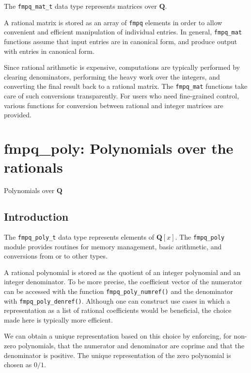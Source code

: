 \documentclass[a4paper,10pt]{book}
\newcommand{\Q}{\mathbf{Q}}%
\newcommand{\code}{\lstinline}
\begin{document}
{{The \code{fmpq_mat_t} data type represents matrices over $\Q$.

A rational matrix is stored as an array of \code{fmpq} elements in order
to allow convenient and efficient manipulation of individual entries.
In general, \code{fmpq_mat} functions assume that input entries are
in canonical form, and produce output with entries in canonical form.

Since rational arithmetic is expensive, computations are typically performed
by clearing denominators, performing the heavy work over the integers,
and converting the final result back to a rational matrix. The
\code{fmpq_mat} functions take care of such conversions transparently.
For users who need fine-grained control, various
functions for conversion between rational and integer matrices are provided.




\chapter{fmpq\_poly: Polynomials over the rationals}
\epigraph{Polynomials over $\Q$}{}

\section{Introduction}

The \code{fmpq_poly_t} data type represents elements of $\Q[x]$. The
\code{fmpq_poly} module provides routines for memory management, basic
arithmetic, and conversions from or to other types.

A rational polynomial is stored as the quotient of an integer polynomial
and an integer denominator.  To be more precise, the coefficient vector
of the numerator can be accessed with the function \code{fmpq_poly_numref()}
and the denominator with \code{fmpq_poly_denref()}.  Although one can
construct use cases in which a representation as a list of rational
coefficients would be beneficial, the choice made here is typically
more efficient.

We can obtain a unique representation based on this choice by enforcing,
for non-zero polynomials, that the numerator and denominator are coprime
and that the denominator is positive.  The unique representation of the
zero polynomial is chosen as $0/1$.

}}
\end{document}
